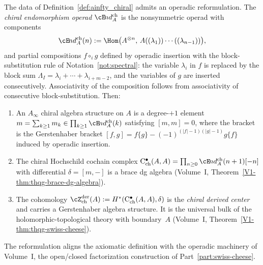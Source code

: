 \begin{remark}
\label{rem:operadic-formulation}
The data of Definition~\ref{def:ainfty_chiral} admits an operadic
reformulation. The \emph{chiral endomorphism operad}
$\cE\!nd^{\mathrm{ch}}_A$ is the nonsymmetric operad with components
\[
\cE\!nd^{\mathrm{ch}}_A(n)
:=
\Hom\bigl(A^{\otimes n},\,
A((\lambda_1))\cdots((\lambda_{n-1}))\bigr),
\]
and partial compositions $f \circ_i g$ defined by operadic insertion
with the block-substitution rule of Notation~\ref{not:spectral}:
the variable $\lambda_i$ in $f$ is replaced by the block sum
$\Lambda_I = \lambda_i + \cdots + \lambda_{i+m-2}$, and the
variables of $g$ are inserted consecutively.
Associativity of the composition follows from associativity of
consecutive block-substitution. Then:
\begin{enumerate}[label=\textup{(\roman*)}]
\item An $A_\infty$ chiral algebra structure on $A$ is a degree-$+1$
 element $m = \sum_{k \ge 1} m_k \in \prod_{k \ge 1}
 \cE\!nd^{\mathrm{ch}}_A(k)$ satisfying $[m, m] = 0$, where
 the bracket is the Gerstenhaber bracket
 $[f,g] = f\{g\} - (-1)^{(|f|-1)(|g|-1)} g\{f\}$
 induced by operadic insertion.
\item The chiral Hochschild cochain complex
 $\mathrm{C}^\bullet_{\mathrm{ch}}(A, A)
 = \prod_{n \ge 0} \cE\!nd^{\mathrm{ch}}_A(n+1)[-n]$
 with differential $\delta = [m, -]$ is a brace dg algebra
 \textup{(}Volume~I, Theorem~\textup{\ref*{V1-thm:thqg-brace-dg-algebra}}\textup{)}.
\item The cohomology
 $\cZ^{\mathrm{der}}_{\mathrm{ch}}(A)
 := H^*(\mathrm{C}^\bullet_{\mathrm{ch}}(A, A), \delta)$
 is the \emph{chiral derived center} and carries a Gerstenhaber algebra
 structure. It is the universal bulk of the holomorphic-topological
 theory with boundary~$A$
 \textup{(}Volume~I, Theorem~\textup{\ref*{V1-thm:thqg-swiss-cheese}}\textup{)}.
\end{enumerate}
The reformulation aligns the axiomatic definition with the operadic
machinery of Volume~I, the open/closed factorization construction
of Part~\ref{part:swiss-cheese}.
\end{remark}

